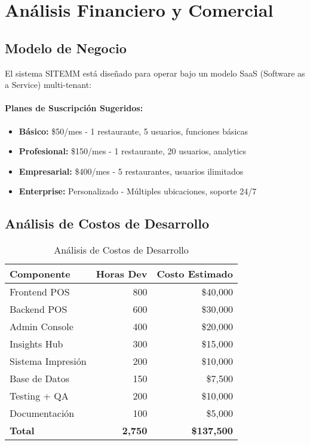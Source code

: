 \documentclass[12pt,a4paper]{article}
\begin{document}
\section{Análisis Financiero y Comercial}

\subsection{Modelo de Negocio}

El sistema SITEMM está diseñado para operar bajo un modelo SaaS (Software as a Service) multi-tenant:

\paragraph{Planes de Suscripción Sugeridos:}
\begin{itemize}
    \item \textbf{Básico:} \$50/mes - 1 restaurante, 5 usuarios, funciones básicas
    \item \textbf{Profesional:} \$150/mes - 1 restaurante, 20 usuarios, analytics
    \item \textbf{Empresarial:} \$400/mes - 5 restaurantes, usuarios ilimitados
    \item \textbf{Enterprise:} Personalizado - Múltiples ubicaciones, soporte 24/7
\end{itemize}

\subsection{Análisis de Costos de Desarrollo}

\begin{table}[H]
\centering
\begin{tabular}{@{}lrr@{}}
\toprule
\textbf{Componente} & \textbf{Horas Dev} & \textbf{Costo Estimado} \\
\midrule
Frontend POS & 800 & \$40,000 \\
Backend POS & 600 & \$30,000 \\
Admin Console & 400 & \$20,000 \\
Insights Hub & 300 & \$15,000 \\
Sistema Impresión & 200 & \$10,000 \\
Base de Datos & 150 & \$7,500 \\
Testing + QA & 200 & \$10,000 \\
Documentación & 100 & \$5,000 \\
\midrule
\textbf{Total} & \textbf{2,750} & \textbf{\$137,500} \\
\bottomrule
\end{tabular}
\caption{Análisis de Costos de Desarrollo}
\end{table}
\end{document}

